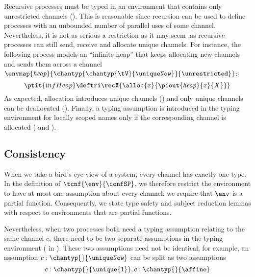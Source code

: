 \documentclass[copyright]{eptcs}
\begin{document}
Recursive processes must be typed in an environment that contains only
unrestricted channels (). This is reasonable since recursion can be
used to define processes with an unbounded number of parallel uses of some
channel. Nevertheless, it is not as serious a restriction as it may seem ,as
recursive processes can still send, receive and allocate unique channels. For
instance, the following process models an ``infinite heap'' that keeps
allocating new channels and sends them across a channel
$\envmap{\textit{heap}}{\chantyp{\chantyp{\tV}{\uniqueNow}}{\unrestricted}}$:
\begin{equation*}
\ptit{infHeap} \deftri \recX{\alloc{x}{\piout{\mathit{heap}}{x}{X}}}
\end{equation*}
As expected, allocation introduces unique channels () and only
unique channels can be deallocated (). Finally, a typing assumption
is introduced in the typing environment for locally scoped names only if the
corresponding channel is allocated ( and ). 

\subsection{Consistency}
\label{sec:Consistency}

When we take a bird's eye-view of a system, every channel has exactly one type.
In the definition of $\tcnf{\env}{\confSP}$, we therefore restrict the
environment to have at most one assumption about every channel: we require that
$\env$ is a partial function. Consequently, we  state type safety and
subject reduction lemmas with respect to environments that are partial
functions.

Nevertheless, when two processes both need a typing assumption relating to the
same channel $c$, there need to be two separate assumptions in the typing
environment (\cf {} in ). These two
assumptions need not be identical;  for example, an assumption $c :
\chantyp{}{\uniqueNow}$ can be split as two assumptions $$c :
\chantyp{}{\unique{1}}, c : \chantyp{}{\affine}$$ 
\end{document}
